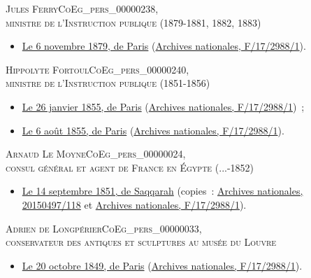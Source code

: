 \documentclass{book}
\begin{document}
{\begin{center} \textsc{Jules Ferry\gls{CoEg_pers_00000238},\\
ministre de l'Instruction publique (1879-1881, 1882, 1883)}\end{center}
\begin{itemize}
\item \hyperlink{CoEg_Mariette_1879-11-06}{Le 6 novembre 1879, de Paris} (\hyperlink{CoEg_Mariette_ms_002}{Archives nationales, F/17/2988/1}).
\end{itemize}

\begin{center} \textsc{Hippolyte Fortoul\gls{CoEg_pers_00000240},\\
ministre de l'Instruction publique (1851-1856)}\end{center}
\begin{itemize}
\item \hyperlink{CoEg_Mariette_1855-01-26}{Le 26 janvier 1855, de Paris} (\hyperlink{CoEg_Mariette_ms_002}{Archives nationales, F/17/2988/1})~;
\item \hyperlink{CoEg_Mariette_1855-08-06}{Le 6 août 1855, de Paris} (\hyperlink{CoEg_Mariette_ms_002}{Archives nationales, F/17/2988/1}).
\end{itemize}

\begin{center} \textsc{Arnaud Le Moyne\gls{CoEg_pers_00000024},\\
consul général et agent de France en Égypte (...-1852)}\end{center}
\begin{itemize}
\item \hyperlink{CoEg_Mariette_1851-09-14a}{Le 14 septembre 1851, de Saqqarah} (copies~: \hyperlink{CoEg_Mariette_ms_001}{Archives nationales, 20150497/118} et \hyperlink{CoEg_Mariette_ms_002}{Archives nationales, F/17/2988/1}).
\end{itemize}

\begin{center} \textsc{Adrien de Longpérier\gls{CoEg_pers_00000033},\\
conservateur des antiques et sculptures au musée du Louvre}\end{center}
\begin{itemize}
\item \hyperlink{CoEg_Mariette_1849-10-20}{Le 20 octobre 1849, de Paris} (\hyperlink{CoEg_Mariette_ms_002}{Archives nationales, F/17/2988/1}).
\end{itemize}

}
\end{document}
